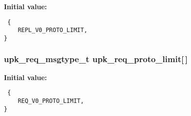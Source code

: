 \textbf{Initial value:}

\begin{Code}\begin{verbatim} {
    REPL_V0_PROTO_LIMIT,
}
\end{verbatim}\end{Code}
\subsubsection{\setlength{\rightskip}{0pt plus 5cm}\bf{upk\_\-req\_\-msgtype\_\-t} \bf{upk\_\-req\_\-proto\_\-limit}[$\,$]}\label{upk__protocol__serializer_8c_54a6ee6325eaa6c6221b317a76a9df9e}


\textbf{Initial value:}

\begin{Code}\begin{verbatim} {
    REQ_V0_PROTO_LIMIT,
}
\end{verbatim}\end{Code}
